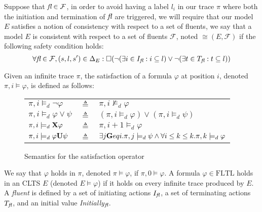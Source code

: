 Suppose that $\emph{fl} \in \mathcal{F}$, in order to avoid having a label $l_i$ in our trace $\pi$ where both the initiation and termination of $\emph{fl}$ are triggered, we will require that our model $E$ satisfies a notion of consistency with respect to a set of fluents, we say that a model $E$ is consistent with respect to a set of fluents $\mathcal{F}$, noted $\cong(E,\mathcal{F})$ if the following safety condition holds: 
\[\forall \emph{fl} \in \mathcal{F}, (s,l,s') \in \Delta_E: \square(\neg(\exists i \in I_{\emph{fl}}: i \subseteq l) \vee \neg(\exists t \in T_{\emph{fl}}: t \subseteq l))\]



Given an infinite trace $\pi$, the satisfaction of a formula $\varphi$ at position $i$, denoted $\pi,i\models\varphi$, is defined as follows:
\begin{figure}[bt]
\begin{tabular}{ l c l }
	$\pi, i \models_d \neg \varphi$ & $\triangleq$ & $\pi, i \not\models_d \varphi$\\
	$\pi, i \models_d \varphi \vee \psi$ & $\triangleq$ & $(\pi, i \models_d \varphi) \vee (\pi, i \models_d \psi)$\\
	$\pi, i \models_d {\bf X} \varphi$ & $\triangleq$ & $\pi, i +1 \models_d \varphi$\\
	$\pi, i \models_d \varphi {\bf U} \psi$ & $\triangleq$ & $\exists j {\bf G} eq i . \pi,j \models_d \psi \wedge \forall i \leq k \le k. \pi, k \models_d \varphi$\\
\end{tabular}
\caption{Semantics for the satisfaction operator}
\label{fig:back:satisfactionop}
\end{figure}

We say that $\varphi$ holds in $\pi$, denoted $\pi\models\varphi$, if $\pi,0\models\varphi$. 
A formula $\varphi \in \mbox{FLTL}$ holds in an CLTS $E$ (denoted $E \models \varphi$) if it holds on every infinite trace produced by $E$.
A \emph{fluent} \fluent \space is defined by a set of initiating actions $I_{\emph{fl}}$, a set of terminating actions $T_{\emph{fl}}$, and an initial value \emph{Initially}$_{\emph{fl}}$.

